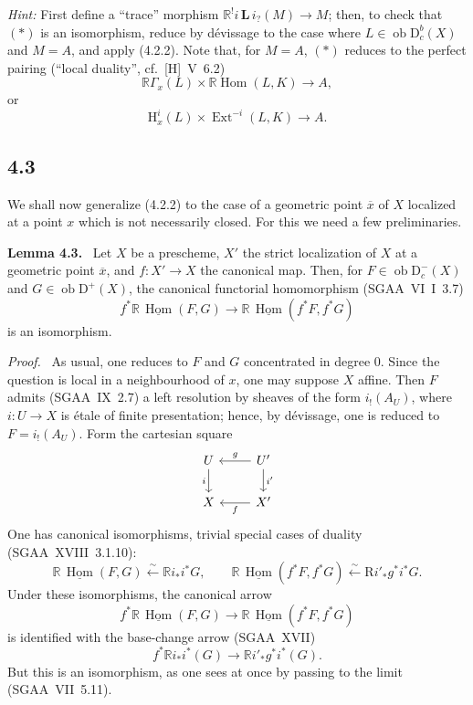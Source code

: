 \documentclass[11pt]{article}
\newenvironment{statement}[1]{\par\medskip\noindent\textbf{#1.}\ }{\par\medskip}
\newenvironment{prooftext}[1][Proof]{\par\noindent\emph{#1.}\ }{\par\medskip}
\renewcommand{\H}{\mathrm{H}}
\DeclareMathOperator{\Hom}{Hom}
\DeclareMathOperator{\Ext}{Ext}
\newcommand{\R}{\mathrm{R}}
\newcommand{\D}{\mathrm{D}}
\newcommand{\ob}{\operatorname{ob}}
\newcommand{\ol}[1]{\overline{#1}}
\providecommand{\Hom}{\operatorname{Hom}}
\providecommand{\ob}{\operatorname{ob}}
\providecommand{\R}{\mathrm R}
\providecommand{\Hom}{\operatorname{Hom}}
\begin{document}
\emph{Hint:} First define a ``trace'' morphism $\mathbb{R}^{!}i\,\mathbf L\, i_?(M)\to M$; then, to check that $(*)$ is an isomorphism, reduce by dévissage to the case where $L\in\ob\D_c^b(X)$ and $M=A$, and apply (4.2.2). Note that, for $M=A$, $(*)$ reduces to the perfect pairing (``local duality'', cf.~[H]~V~6.2)
\[
\mathbb{R}\Gamma_x(L)\times \mathbb{R}\Hom(L,K)\longrightarrow A,
\]
or
\[
\H_x^i(L)\times \Ext^{-i}(L,K)\longrightarrow A.
\]

\subsection*{4.3}
We shall now generalize (4.2.2) to the case of a geometric point $\ol{x}$ of $X$ localized at a point $x$ which is not necessarily closed. For this we need a few preliminaries.

\begin{statement}{Lemma 4.3}
Let $X$ be a prescheme, $X'$ the strict localization of $X$ at a geometric point $\ol{x}$, and $f:X'\to X$ the canonical map. Then, for $F\in\ob\D_c^-(X)$ and $G\in\ob\D^+(X)$, the canonical functorial homomorphism (SGAA~VI~I~3.7)
\[
f^*\mathbb{R}\,\underline{\Hom}(F,G)\longrightarrow \mathbb{R}\,\underline{\Hom}(f^*F,f^*G)
\]
is an isomorphism.
\end{statement}

\begin{prooftext}[Proof]
As usual, one reduces to $F$ and $G$ concentrated in degree $0$. Since the question is local in a neighbourhood of $x$, one may suppose $X$ affine. Then $F$ admits (SGAA~IX~2.7) a left resolution by sheaves of the form $i_!(A_U)$, where $i:U\to X$ is étale of finite presentation; hence, by dévissage, one is reduced to $F=i_!(A_U)$. Form the cartesian square
\[
\begin{tikzcd}
U \arrow[d,"i"'] & U' \arrow[l,"g"'] \arrow[d,"i'"] \\
X & X' \arrow[l,"f"]
\end{tikzcd}
\]
One has canonical isomorphisms, trivial special cases of duality (SGAA~XVIII~3.1.10):
\[
\mathbb{R}\,\underline{\Hom}(F,G)\xleftarrow{\sim}\mathbb{R} i_* i^*G,
\qquad
\mathbb{R}\,\underline{\Hom}(f^*F,f^*G)\xleftarrow{\sim}\R i'_* g^*i^*G.
\]
Under these isomorphisms, the canonical arrow
\[
f^*\mathbb{R}\,\underline{\Hom}(F,G)\longrightarrow \mathbb{R}\,\underline{\Hom}(f^*F,f^*G)
\]
is identified with the base-change arrow (SGAA~XVII)
\[
f^*\mathbb{R} i_*i^*(G)\longrightarrow \mathbb{R} i'_*g^*i^*(G).
\]
But this is an isomorphism, as one sees at once by passing to the limit (SGAA~VII~5.11).
\end{prooftext}
\end{document}

